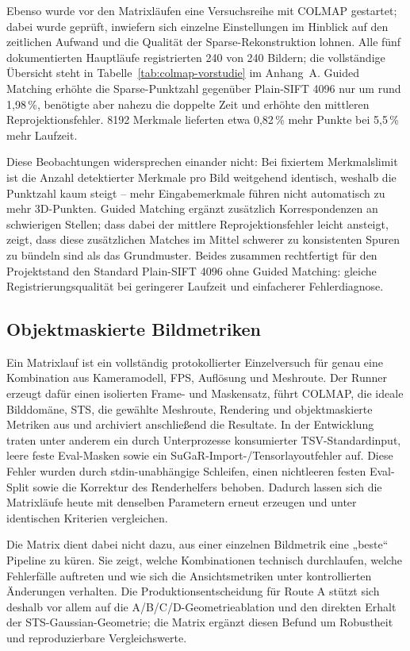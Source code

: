 Ebenso wurde vor den Matrixläufen eine Versuchsreihe mit COLMAP gestartet;
dabei wurde geprüft, inwiefern sich einzelne Einstellungen im Hinblick auf den
zeitlichen Aufwand und die Qualität der Sparse-Rekonstruktion lohnen. Alle
fünf dokumentierten Hauptläufe registrierten 240 von 240 Bildern; die
vollständige Übersicht steht in Tabelle~\ref{tab:colmap-vorstudie} im Anhang~A. Guided
Matching erhöhte die Sparse-Punktzahl gegenüber Plain-SIFT 4096 nur um rund
1,98\,\%, benötigte aber nahezu die doppelte Zeit und erhöhte den mittleren
Reprojektionsfehler. 8192 Merkmale lieferten etwa 0,82\,\% mehr Punkte bei
5,5\,\% mehr Laufzeit.

Diese Beobachtungen widersprechen einander nicht: Bei fixiertem
Merkmalslimit ist die Anzahl detektierter Merkmale pro Bild weitgehend
identisch, weshalb die Punktzahl kaum steigt -- mehr Eingabemerkmale führen
nicht automatisch zu mehr 3D-Punkten. Guided Matching ergänzt zusätzlich
Korrespondenzen an schwierigen Stellen; dass dabei der mittlere
Reprojektionsfehler leicht ansteigt, zeigt, dass diese zusätzlichen Matches
im Mittel schwerer zu konsistenten Spuren zu bündeln sind als das
Grundmuster. Beides zusammen rechtfertigt für den Projektstand den Standard
Plain-SIFT 4096 ohne Guided Matching: gleiche Registrierungsqualität bei
geringerer Laufzeit und einfacherer Fehlerdiagnose.

\subsection{Objektmaskierte Bildmetriken}

Ein Matrixlauf ist ein vollständig protokollierter Einzelversuch für genau
eine Kombination aus Kameramodell, FPS, Auflösung und Meshroute. Der Runner
erzeugt dafür einen isolierten Frame- und Maskensatz, führt COLMAP, die ideale
Bilddomäne, STS, die gewählte Meshroute, Rendering und objektmaskierte
Metriken aus und archiviert anschließend die Resultate. In der Entwicklung
traten unter anderem ein durch Unterprozesse konsumierter TSV-Standardinput,
leere feste Eval-Masken sowie ein SuGaR-Import-/Tensorlayoutfehler auf. Diese
Fehler wurden durch stdin-unabhängige Schleifen, einen nichtleeren festen
Eval-Split sowie die Korrektur des Renderhelfers behoben. Dadurch lassen sich
die Matrixläufe heute mit denselben Parametern erneut erzeugen und unter
identischen Kriterien vergleichen.

Die Matrix dient dabei nicht dazu, aus einer einzelnen Bildmetrik eine
„beste“ Pipeline zu küren. Sie zeigt, welche Kombinationen technisch
durchlaufen, welche Fehlerfälle auftreten und wie sich die Ansichtsmetriken
unter kontrollierten Änderungen verhalten. Die Produktionsentscheidung für
Route A stützt sich deshalb vor allem auf die A/B/C/D-Geometrieablation und
den direkten Erhalt der STS-Gaussian-Geometrie; die Matrix ergänzt diesen
Befund um Robustheit und reproduzierbare Vergleichswerte.

